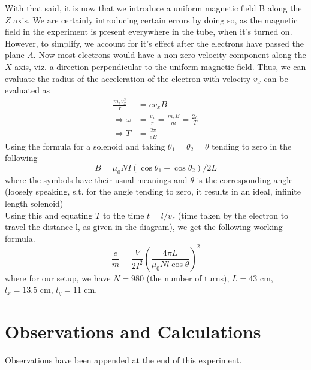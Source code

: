 	With that said, it is now that we introduce a uniform magnetic field B along the $Z$ axis. We are certainly introducing certain errors by doing so, as the magnetic field in the experiment is present everywhere in the tube, when it's turned on. However, to simplify, we account for it's effect after the electrons have passed the plane $A$. Now most electrons would have a non-zero velocity component along the $X$ axis, viz. a direction perpendicular to the uniform magnetic field. Thus, we can evaluate the radius of the acceleration of the electron with velocity $v_x$ can be evaluated as
	\begin{align}
		\frac {m_e v_x^2 } r &= e v_x B \\
		\Rightarrow \omega &= \frac {v_x} r = \frac {m_e B} {m}  = \frac {2 \pi} {T} \\		
		\Rightarrow T &=\frac {2\pi} {eB}		
	\end{align}
	Using the formula for a solenoid and taking $\theta_1 = \theta_2 = \theta$ tending to zero in the following
	\begin{equation}
		B = \mu_0 N I (\cos {\theta_1} - \cos{\theta_2})/2L
	\end{equation}
	where the symbols have their usual meanings and $\theta$ is the corresponding angle (loosely speaking, s.t. for the angle tending to zero, it results in an ideal, infinite length solenoid)\\
	Using this and equating $T$ to the time $t=l/v_z$ (time taken by the electron to travel the distance l, as given in the diagram), we get the following working formula.
	\begin{equation}
		\frac e m = \frac {V}{2I^2} \left( \frac {4 \pi L} {\mu_0 N l \cos {\theta}} \right) ^2
	\end{equation}		
	where for our setup, we have $N=980$ (the number of turns), $L=43$ cm, $l_x=13.5$ cm, $l_y=11$ cm.
\section{Observations and Calculations}
	Observations have been appended at the end of this experiment. \\



